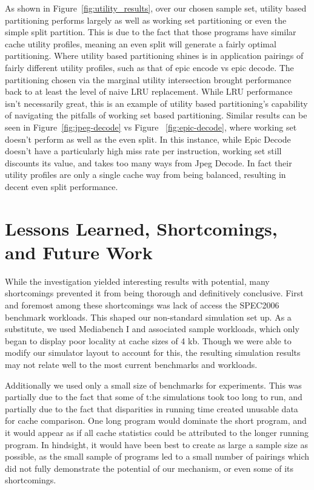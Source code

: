 \documentclass{acm_proc_article-sp}
\begin{document}
As shown in Figure~\ref{fig:utility_results}, over our chosen sample set, utility based partitioning performs largely as well as working set partitioning or even the simple split partition. This is due to the fact that those programs have similar cache utility profiles, meaning an even split
will generate a fairly optimal partitioning. Where utility based partitioning shines is in application pairings of fairly different
utility profiles, such as that of epic encode vs epic decode. The partitioning chosen via the marginal utility intersection brought performance back to at least the level of naive LRU replacement. While LRU performance isn't necessarily great,  this is an example of utility based partitioning's capability of navigating the pitfalls of working set based partitioning. Similar results can be seen in Figure~\ref{fig:jpeg-decode} vs Figure ~\ref{fig:epic-decode}, where working set doesn't perform as well as the even split. In this instance, while Epic Decode doesn't have a particularly high miss rate per instruction, working set still discounts its value, and takes too many ways from Jpeg Decode.  In fact their utility profiles are only a single cache way from being balanced, resulting in decent even split performance.

\section{Lessons Learned, Shortcomings, and Future Work}
 
While the investigation yielded interesting results with potential, many shortcomings prevented it from being thorough and definitively conclusive. First and foremost among these shortcomings was lack of access the SPEC2006 benchmark workloads. This shaped our non-standard simulation set up. As a substitute, we used Mediabench I and associated sample workloads, which only began to display poor locality at cache sizes of 4 kb. Though we were able to modify our simulator layout to account for this, the resulting simulation results may not relate well to the most current benchmarks and workloads.

Additionally we used only a small size of benchmarks for experiments. This was partially due to the fact that some of t:he simulations took too long to run, and partially due to the fact that disparities in running time created unusable data for
cache comparison. One long program would dominate the short program, and it would appear as if all cache statistics could be attributed to the longer running program. In hindsight, it would have been best to create as large a sample size
as possible, as the small sample of programs led to a small number of pairings which did not fully demonstrate the potential of our mechanism, or even some of its shortcomings.
\end{document}
